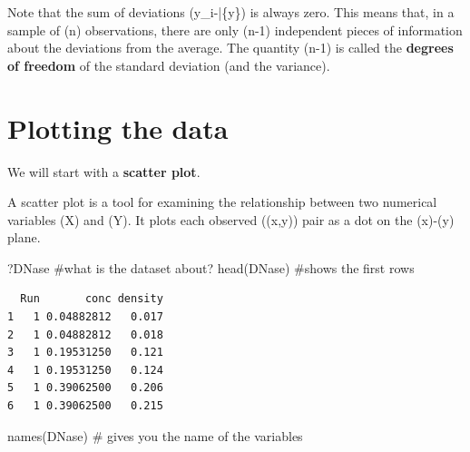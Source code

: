 \documentclass[
  letterpaper,
  DIV=11,
  numbers=noendperiod]{scrreprt}
\newenvironment{Shaded}{\begin{snugshade}}{\end{snugshade}}
\newcommand{\CommentTok}[1]{\textcolor[rgb]{0.37,0.37,0.37}{#1}}
\newcommand{\FunctionTok}[1]{\textcolor[rgb]{0.28,0.35,0.67}{#1}}
\newcommand{\NormalTok}[1]{\textcolor[rgb]{0.00,0.23,0.31}{#1}}
\begin{document}
\begin{tcolorbox}[enhanced jigsaw, arc=.35mm, bottomrule=.15mm, bottomtitle=1mm, breakable, colback=white, colbacktitle=quarto-callout-important-color!10!white, colframe=quarto-callout-important-color-frame, coltitle=black, left=2mm, leftrule=.75mm, opacityback=0, opacitybacktitle=0.6, rightrule=.15mm, title=\textcolor{quarto-callout-important-color}{\faExclamation}\hspace{0.5em}{Why (n-1) in the standard deviation?}, titlerule=0mm, toprule=.15mm, toptitle=1mm]

Note that the sum of deviations (y\_i-\bar\{y\}) is always zero. This
means that, in a sample of (n) observations, there are only (n-1)
independent pieces of information about the deviations from the average.
The quantity (n-1) is called the \textbf{degrees of freedom} of the
standard deviation (and the variance).

\end{tcolorbox}

\section{Plotting the data}\label{plotting-the-data}

We will start with a \textbf{scatter plot}.

A scatter plot is a tool for examining the relationship between two
numerical variables (X) and (Y). It plots each observed ((x,y)) pair as
a dot on the (x)-(y) plane.

\begin{Shaded}
\begin{Highlighting}[]
\NormalTok{?DNase  }\CommentTok{\#what is the dataset about?}
\FunctionTok{head}\NormalTok{(DNase) }\CommentTok{\#shows the first rows}
\end{Highlighting}
\end{Shaded}

\begin{verbatim}
  Run       conc density
1   1 0.04882812   0.017
2   1 0.04882812   0.018
3   1 0.19531250   0.121
4   1 0.19531250   0.124
5   1 0.39062500   0.206
6   1 0.39062500   0.215
\end{verbatim}

\begin{Shaded}
\begin{Highlighting}[]
\FunctionTok{names}\NormalTok{(DNase) }\CommentTok{\# gives you the name of the variables}
\end{Highlighting}
\end{Shaded}
\end{document}
